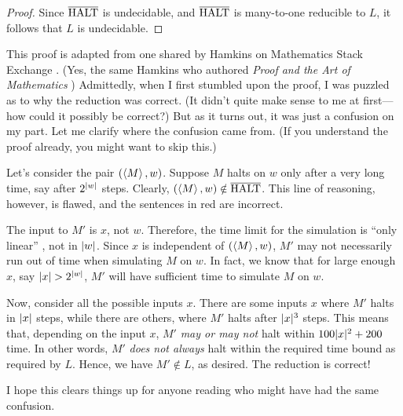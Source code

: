 \begin{problem}
\begin{sol}
\begin{proof}
        Since $\overline{\text{HALT}}$ is undecidable, and $\overline{\text{HALT}}$ is many-to-one reducible to $L$, it follows that $L$ is undecidable.
      \end{proof}

      \vspace{\parskip}

      \begin{remark}
        This proof is adapted from one shared by Hamkins on Mathematics Stack Exchange \cite{hamkins2011to}. (Yes, the same Hamkins who authored \emph{Proof and the Art of Mathematics} \cite{hamkins2020proof}) Admittedly, when I first stumbled upon the proof, I was puzzled as to why the reduction was correct. (It didn't quite make sense to me at first—how could it possibly be correct?) But as it turns out, it was just a confusion on my part. Let me clarify where the confusion came from. (If you understand the proof already, you might want to skip this.)

        Let's consider the pair $(\left< M \right>, w)$. Suppose $M$ halts on $w$ only after a very long time, say after $2^{| w |}$ steps. Clearly, $(\left< M \right>, w) \notin \overline{\text{HALT}}$.  This line of reasoning, however, is flawed, and the sentences in red are incorrect.

        The input to $M'$ is $x$, not $w$. Therefore, the time limit for the simulation is ``only linear'' , not in $| w |$. Since $x$ is independent of $(\left< M \right>, w)$, $M'$ may not necessarily run out of time when simulating $M$ on $w$. In fact, we know that for large enough $x$, say $| x | > 2^{| w |}$, $M'$ will have sufficient time to simulate $M$ on $w$.

        Now, consider all the possible inputs $x$. There are some inputs $x$ where $M'$ halts in $| x |$ steps, while there are others, where $M'$ halts after $| x |^3$ steps. This means that, depending on the input $x$, $M'$ \emph{may or may not} halt within $100 | x |^2 + 200$ time. In other words, $M'$ \emph{does not always} halt within the required time bound as required by $L$. Hence, we have $M' \notin L$, as desired. The reduction is correct!

        I hope this clears things up for anyone reading who might have had the same confusion.
      \end{remark}
    \end{sol}
  \end{problem}

